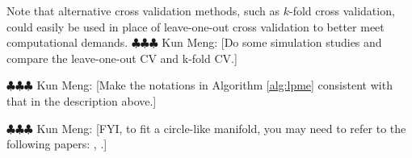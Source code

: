 \documentclass[11pt,reqno]{article}
\newcommand{\meng}[1]{{\color{purple} \sf $\clubsuit\clubsuit\clubsuit$ Kun Meng: [#1]}}
\theoremstyle{definition}
\begin{document}
Note that alternative cross validation methods, such as $k$-fold cross validation, could easily be used in place of leave-one-out cross validation to better meet computational demands. \meng{Do some simulation studies and compare the leave-one-out CV and k-fold CV.}

\LinesNumbered


\LinesNumbered

\meng{Make the notations in Algorithm \ref{alg:lpme} consistent with that in the description above.}

\meng{FYI, to fit a circle-like manifold, you may need to refer to the following papers: \cite{fasy2014confidence}, \cite{dunsonInferringManifoldsNoisy2022}.}
\end{document}
